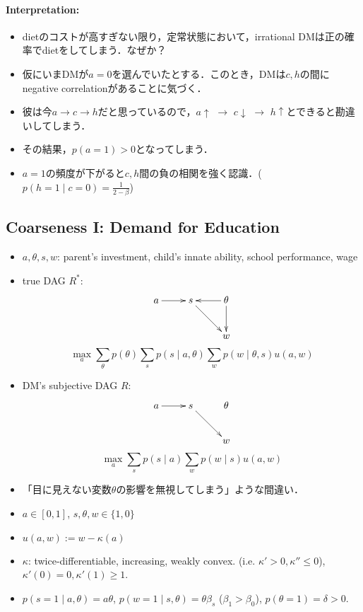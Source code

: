 \documentclass[11pt,a4paper,dvipdfmx]{article}
\theoremstyle{plain}
\begin{document}
\paragraph{Interpretation:}
\begin{itemize}
	\item dietのコストが高すぎない限り，定常状態において，irrational DMは正の確率でdietをしてしまう．なぜか？
	\item 仮にいまDMが$a=0$を選んでいたとする．このとき，DMは$c,h$の間にnegative correlationがあることに気づく．
	\item 彼は今$a \to c \to h$だと思っているので，$a \uparrow$ $\to$ $c \downarrow$ $\to$ $h \uparrow$とできると勘違いしてしまう．
	\item その結果，$p(a=1) > 0$となってしまう． 
	\item $a = 1$の頻度が下がると$c,h$間の負の相関を強く認識．($p(h=1 \mid c=0) = \frac{1}{2 - \beta}$)
\end{itemize}



\subsection{Coarseness I: Demand for Education}
\begin{itemize}
	\item $a, \theta, s, w$: parent's investment, child's innate ability, school performance, wage
	\item true DAG $R^*:$
\[
\xymatrix{
	a \ar[r] & s \ar[rd] & \theta \ar[l] \ar[d] \\
	& & w
}
\]
\[
\max_a \sum_\theta p(\theta) \sum_s p(s \mid a, \theta) \sum_w p(w \mid \theta, s) u(a, w)
\]

	\item DM's subjective DAG $R:$
\[
\xymatrix{
	a \ar[r] & s \ar[rd] & \theta \\
	& & w
}
\]
\[
\max_a \sum_s p(s \mid a) \sum_w p(w \mid s) u(a, w)
\]

	\item 「目に見えない変数$\theta$の影響を無視してしまう」ような間違い．
	\item $a \in [0,1]$, $s, \theta, w \in \{1, 0\}$
	\item $u(a,w) := w - \kappa(a)$
	\item $\kappa$: twice-differentiable, increasing, weakly convex. (i.e. $\kappa' > 0, \kappa''  \leq 0$), $\kappa'(0)=0, \kappa'(1) \geq 1$.
	\item $p(s=1 \mid a, \theta) = a \theta$, $p(w=1 \mid s, \theta) = \theta \beta_s$ ($\beta_1 > \beta_0$), $p(\theta = 1) = \delta > 0$.
\end{itemize}
\end{document}
